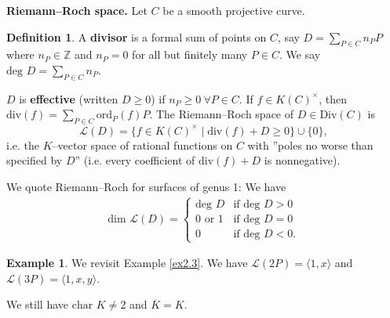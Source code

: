 \documentclass{article}
\theoremstyle{definition}
\newtheorem{example}[theorem]{Example}
\newtheorem{defn}{Definition}[section]
\begin{document}
\textbf{Riemann--Roch space.} Let $C$ be a smooth projective curve. 
\begin{defn}
    A \textbf{divisor} is a formal sum of points on $C$, say $D = \sum_{P \in C}^{} n_P P$ where $n_P \in \mathbb{Z}$ and $n_P = 0$ for all but finitely many $P \in C$. We say $\text{deg }D= \sum_{P \in C}^{} n_P$.
    \vspace{1mm}
     
    $D$ is \textbf{effective} (written $D\ge 0$) if $n_P \ge 0 ~\forall P \in C$. If $f \in K(C)^\times$, then $\text{div}(f) = \sum_{P \in C}^{} \text{ord}_P(f)P$. The Riemann--Roch space of $D \in \text{Div}(C)$ is  
    \[
        \mathcal{L}(D) = \{f \in K(C)^\times \mid \text{div}(f) + D \ge 0\} \cup \{0\},
    \]
    i.e. the $K$--vector space of rational functions on $C$ with ''poles no worse than specified by $D$'' (i.e. every coefficient of $\text{div}(f)+D$ is nonnegative).
\end{defn}
We quote Riemann--Roch for surfaces of genus 1: We have
\begin{align*}
    \text{dim }\mathcal{L}(D) = \begin{cases}
        \text{deg }D &\text{if deg }D>0\\
        0 \text{ or }1 &\text{if deg }D=0\\
        0 &\text{if deg }D<0.
    \end{cases}
\end{align*}
\begin{example}
    We revisit Example \ref{ex2.3}. We have $\mathcal{L}(2P) = \langle 1,x \rangle$ and $\mathcal{L}(3P) = \langle 1,x,y \rangle$.
\end{example}


We still have $\text{char }K \neq 2$ and $\overline{K} = K$.
\end{document}

